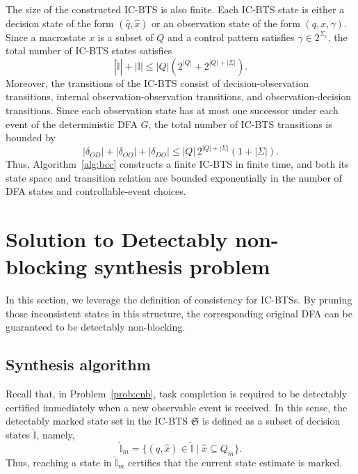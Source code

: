 \documentclass[twocolumn]{autart}
\begin{document}
The size of the constructed IC-BTS is also finite. 
Each IC-BTS state is either a decision state of the form $(\hat{q}, \hat{x})$ or an observation state of the form $(q, x, \gamma)$. Since a macrostate $x$ is a subset of $Q$ and a control pattern satisfies $\gamma\in 2^{\Sigma_c}$, the total number of IC-BTS states satisfies
\begin{equation}
    \label{eq:prop:bcc:1}
    |\hat{\mathbb{I}}| + |\mathbb{I}| \leq |Q|(2^{|Q|}+2^{|Q|+|\Sigma|}).    
\end{equation}
Moreover, the transitions of the IC-BTS consist of decision-observation transitions, internal observation-observation transitions, and observation-decision transitions. Since each observation state has at most one successor under each event of the deterministic DFA $G$, the total number of IC-BTS transitions is bounded by
\begin{equation}
    \label{eq:prop:bcc:2}
    |\delta_{OD}| + |\delta_{OO}| + |\delta_{DO}| \leq |Q|\,2^{|Q|+|\Sigma|}(1+|\Sigma|).
\end{equation}
Thus, Algorithm~\ref{alg:bcc} constructs a finite IC-BTS in finite time, and both its state space and transition relation are bounded exponentially in the number of DFA states and controllable-event choices.








\section{Solution to Detectably non-blocking synthesis problem}\label{sec:solu}

In this section, we leverage the definition of consistency for IC-BTSs.
By pruning those inconsistent states in this structure, the corresponding original DFA can be guaranteed to be detectably non-blocking.

\subsection{Synthesis algorithm}\label{subsec:supervisor_induction}

Recall that, in Problem~\ref{prob:cnb}, task completion is required to be detectably certified immediately when a new observable event is received.
In this sense, the detectably marked state set in the IC-BTS $\mathfrak{S}$ is defined as a subset of decision states $\hat{\mathbb{I}}$, namely,
$$
\hat{\mathbb{I}}_m = \{(\hat{q},\hat{x})\in\hat{\mathbb{I}} \mid \hat{x}\subseteq Q_m\}.
$$
Thus, reaching a state in $\hat{\mathbb{I}}_m$ certifies that the current state estimate is marked.
\end{document}

